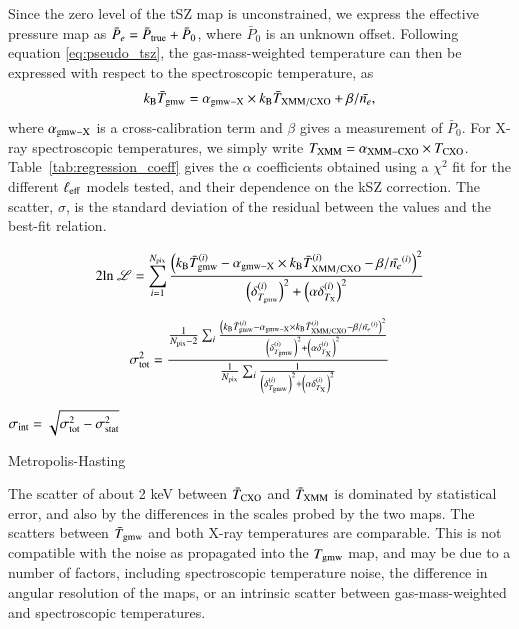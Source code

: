 \documentclass[twocolumn,traditabstract]{aa}
\begin{document}
Since the zero level of the tSZ map is unconstrained, we express the effective pressure map as $\bar{P}_e = \bar{P}_{\rm true} + \bar{P}_0$, where $\bar{P}_0$ is an unknown offset. Following equation \ref{eq:pseudo_tsz}, the gas-mass-weighted temperature can then be expressed with respect to the spectroscopic temperature, as
\begin{equation}
k_{\rm B} \bar{T}_{\rm gmw} = \alpha_{\rm gmw-X} \times k_{\rm B} \bar{T}_{\rm XMM/CXO} + {\beta}/{\bar{n_e}},
\label{eq:TSZ_TX_regression}
\end{equation}
where $\alpha_{\rm gmw-X}$ is a cross-calibration term and $\beta$ gives a measurement of $\bar{P}_0$. For X-ray spectroscopic temperatures, we simply write $T_{\rm XMM} = \alpha_{\rm XMM-CXO} \times T_{\rm CXO}$. Table~\ref{tab:regression_coeff} gives the $\alpha $ coefficients obtained using a $\chi^2$ fit for the different $\ell_{\rm eff}$ models tested, and their dependence on the kSZ correction. The scatter, $\sigma$, is the standard deviation of the residual between the values and the best-fit relation. 

{\bf 
\citep{Orear1982}

\begin{equation}
2 {\rm ln} \ \mathscr{L} = \sum_{i=1}^{N_{\rm pix}} \frac{\left(k_{\rm B} \bar{T}^{(i)}_{\rm gmw} - \alpha_{\rm gmw-X} \times k_{\rm B} \bar{T}^{(i)}_{\rm XMM/CXO} - {\beta}/{\bar{n_e}^{(i)}}\right)^2}{\left(\delta^{(i)}_{T_{\rm gmw}}\right)^2 + \left(\alpha \delta^{(i)}_{T_{\rm X}}\right)^2}
\label{eq:chi2_def}
\end{equation}

\citep{Pratt2009}

\begin{equation}
\sigma_{\rm tot}^2 = \frac{\frac{1}{N_{\rm pix} - 2} \sum_i \frac{\left(k_{\rm B} \bar{T}^{(i)}_{\rm gmw} - \alpha_{\rm gmw-X} \times k_{\rm B} \bar{T}^{(i)}_{\rm XMM/CXO} - {\beta}/{\bar{n_e}^{(i)}}\right)^2}{\left(\delta^{(i)}_{T_{\rm gmw}}\right)^2 + \left(\alpha \delta^{(i)}_{T_{\rm X}}\right)^2}}{\frac{1}{N_{\rm pix}} \sum_i \frac{1}{\left(\delta^{(i)}_{T_{\rm gmw}}\right)^2 + \left(\alpha \delta^{(i)}_{T_{\rm X}}\right)^2}}
\label{eq:scatter_def}
\end{equation}

$\sigma_{\rm int} = \sqrt{\sigma_{\rm tot}^2 - \sigma_{\rm stat}^2}$

Metropolis-Hasting \citep{Chib1995}
}

The scatter of about 2 keV between $\bar{T}_{\rm CXO}$ and $\bar{T}_{\rm XMM}$ is dominated by statistical error, and also by the differences in the scales probed by the two maps. The scatters between $\bar{T}_{\rm gmw}$ and both X-ray temperatures are comparable. This is not compatible with the noise as propagated into the $T_{\rm gmw}$ map, and may be due to a number of factors, including spectroscopic temperature noise, the difference in angular resolution of the maps, or an intrinsic scatter between gas-mass-weighted and spectroscopic temperatures.
\end{document}

